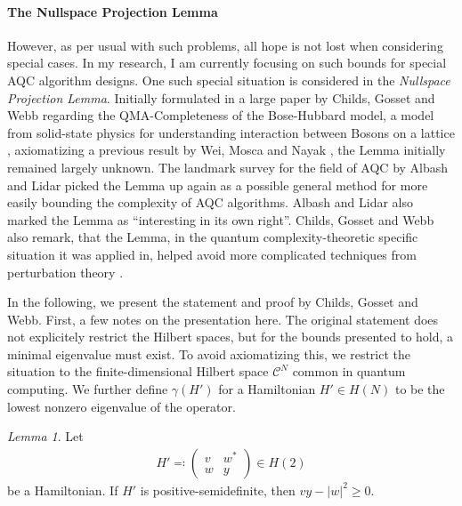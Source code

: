 \documentclass[10pt]{amsart}
\theoremstyle{definition}
\theoremstyle{remark}
\newtheorem{lemma}[theorem]{Lemma}
\begin{document}
    \paragraph*{\textbf{The Nullspace Projection Lemma}} However, as per usual with such problems, all hope is not lost when considering special cases. In my research, I am currently focusing on such bounds for special AQC algorithm designs. One such special situation is considered in the \emph{Nullspace Projection Lemma}. Initially formulated in a large paper by Childs, Gosset and Webb regarding the QMA-Completeness of the Bose-Hubbard model, a model from solid-state physics for understanding interaction between Bosons on a lattice \cite{Childs_2014}, axiomatizing a previous result by Wei, Mosca and Nayak \cite{Wei_2010}, the Lemma initially remained largely unknown. The landmark survey for the field of AQC by Albash and Lidar picked the Lemma up again \cite[p. 20]{Albash_2018} as a possible general method for more easily bounding the complexity of AQC algorithms. Albash and Lidar also marked the Lemma as \enquote{interesting in its own right}. Childs, Gosset and Webb also remark, that the Lemma, in the quantum complexity-theoretic specific situation it was applied in, helped avoid more complicated techniques from perturbation theory \cite[p. 3]{Childs_2014}.
    
    In the following, we present the statement and proof by Childs, Gosset and Webb. First, a few notes on the presentation here. The original statement does not explicitely restrict the Hilbert spaces, but for the bounds presented to hold, a minimal eigenvalue must exist. To avoid axiomatizing this, we restrict the situation to the finite-dimensional Hilbert space \(\mathcal{C}^N\) common in quantum computing. We further define \(\gamma(H')\) for a Hamiltonian \(H' \in H(N)\) to be the lowest nonzero eigenvalue of the operator.

    \begin{lemma} \label{lem:positive_semidefiniteness_determinant}
        Let
        \begin{align}
            H' \eqqcolon \begin{pmatrix}
                v & w^*\\
                w & y
            \end{pmatrix} \in H(2)
        \end{align}
        be a Hamiltonian. If \(H'\) is positive-semidefinite, then \(vy-|w|^2 \geq 0\).
    \end{lemma}
\end{document}
